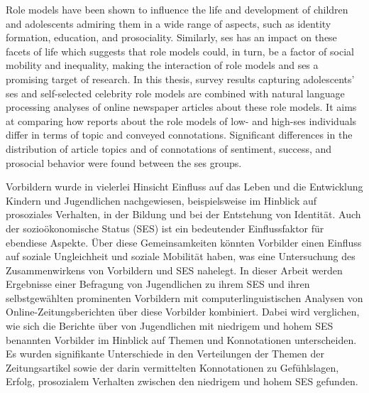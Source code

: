 Role models have been shown to influence the life and development of children and adolescents admiring them in a wide range of aspects, such as identity formation, education, and prosociality. Similarly, \gls{ses} has an impact on these facets of life which suggests that role models could, in turn, be a factor of social mobility and inequality, making the interaction of role models and \gls{ses} a promising target of research. In this thesis, survey results capturing adolescents' \gls{ses} and self-selected celebrity role models are combined with natural language processing analyses of online newspaper articles about these role models. It aims at comparing how reports about the role models of low- and high-\gls{ses} individuals differ in terms of topic and conveyed connotations. Significant differences in the distribution of article topics and of connotations of sentiment, success, and prosocial behavior were found between the \gls{ses} groups.

\vspace{2cm}
Vorbildern wurde in vielerlei Hinsicht Einfluss auf das Leben und die Entwicklung Kindern und Jugendlichen nachgewiesen, beispielsweise im Hinblick auf prosoziales Verhalten, in der Bildung und bei der Entstehung von Identität. Auch der sozioökonomische Status (SES) ist ein bedeutender Einflussfaktor für ebendiese Aspekte. Über diese Gemeinsamkeiten könnten Vorbilder einen Einfluss auf soziale Ungleichheit und soziale Mobilität haben, was eine Untersuchung des Zusammenwirkens von Vorbildern und SES nahelegt. In dieser Arbeit werden Ergebnisse einer Befragung von Jugendlichen zu ihrem SES und ihren selbstgewählten prominenten Vorbildern mit computerlinguistischen Analysen von Online-Zeitungsberichten über diese Vorbilder kombiniert. Dabei wird verglichen, wie sich die Berichte über von Jugendlichen mit niedrigem und hohem SES benannten Vorbilder im Hinblick auf Themen und Konnotationen unterscheiden. Es wurden signifikante Unterschiede in den Verteilungen der Themen der Zeitungsartikel sowie der darin vermittelten Konnotationen zu Gefühlslagen, Erfolg, prosozialem Verhalten zwischen den niedrigem und hohem SES gefunden.

\glsresetall